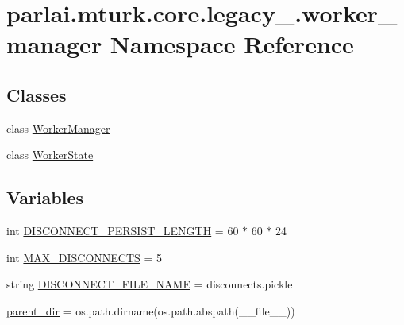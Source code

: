 \hypertarget{namespaceparlai_1_1mturk_1_1core_1_1legacy__2018_1_1worker__manager}{}\section{parlai.\+mturk.\+core.\+legacy\+\_.\+worker\+\_\+manager Namespace Reference}
\label{namespaceparlai_1_1mturk_1_1core_1_1legacy__2018_1_1worker__manager}
\subsection*{Classes}
\begin{DoxyCompactItemize}
\item 
class \hyperlink{classparlai_1_1mturk_1_1core_1_1legacy__2018_1_1worker__manager_1_1WorkerManager}{Worker\+Manager}
\item 
class \hyperlink{classparlai_1_1mturk_1_1core_1_1legacy__2018_1_1worker__manager_1_1WorkerState}{Worker\+State}
\end{DoxyCompactItemize}
\subsection*{Variables}
\begin{DoxyCompactItemize}
\item 
int \hyperlink{namespaceparlai_1_1mturk_1_1core_1_1legacy__2018_1_1worker__manager_acac0e714f401ee9341eb099a4d43c5a7}{D\+I\+S\+C\+O\+N\+N\+E\+C\+T\+\_\+\+P\+E\+R\+S\+I\+S\+T\+\_\+\+L\+E\+N\+G\+TH} = 60 $\ast$ 60 $\ast$ 24
\item 
int \hyperlink{namespaceparlai_1_1mturk_1_1core_1_1legacy__2018_1_1worker__manager_a5c28e68480a308868198474d2cdbf4f9}{M\+A\+X\+\_\+\+D\+I\+S\+C\+O\+N\+N\+E\+C\+TS} = 5
\item 
string \hyperlink{namespaceparlai_1_1mturk_1_1core_1_1legacy__2018_1_1worker__manager_a7a681eee9cb0237a813bea842b7c7c6f}{D\+I\+S\+C\+O\+N\+N\+E\+C\+T\+\_\+\+F\+I\+L\+E\+\_\+\+N\+A\+ME} = \textquotesingle{}disconnects.\+pickle\textquotesingle{}
\item 
\hyperlink{namespaceparlai_1_1mturk_1_1core_1_1legacy__2018_1_1worker__manager_af1f6d9454152c5faa3eb50399a955dcb}{parent\+\_\+dir} = os.\+path.\+dirname(os.\+path.\+abspath(\+\_\+\+\_\+file\+\_\+\+\_\+))
\end{DoxyCompactItemize}



